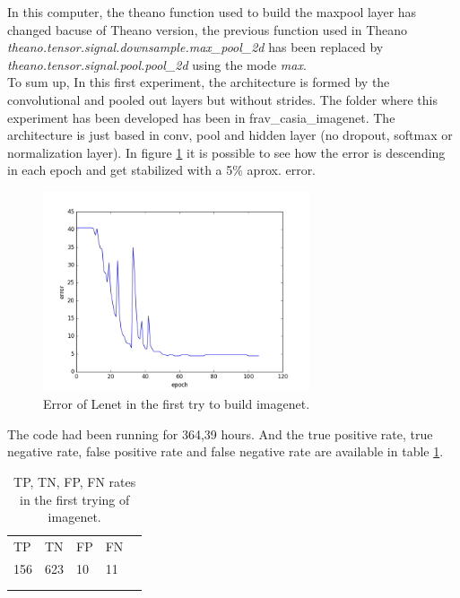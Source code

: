 In this computer, the theano function used to build the max\-pool layer has changed bacuse of Theano version, the previous function used in Theano  \textit{theano.te\-nsor.sig\-nal.down\-sam\-ple.max\-\_pool\_2d} has been replaced by \textit{thea\-no.ten\-sor.sig\-nal.pool.pool\_2d} using the mode \textit{max}.\\

To  sum up, In this first experiment, the architecture is formed by the convolutional and pooled out layers but without strides. The folder where this experiment has been developed has been in frav\_casia\_imagenet. The architecture is just based in conv, pool and hidden layer (no dropout, softmax or normalization layer). In figure \ref{fig:error_imagenet1} it is possible to see how the error is descending in each epoch and get stabilized with a 5\% aprox. error. \\
\begin{figure}[htb]
\centering
\includegraphics[width=0.7\textwidth]{images/imagenet/error_frav-Imagenet1.png}
\caption{Error of Lenet in the first try to build imagenet.} \label{fig:error_imagenet1}
\end{figure}

The code had been running for 364,39 hours. And the true positive rate, true negative rate, false positive rate and false negative rate are available in table \ref{tabla_error_imagenet1}. \\

\begin{table}[htb]
\centering
\label{tabla_error_imagenet1}
\begin{tabular}{lllll}
\cline{1-4}
\multicolumn{1}{|l}{TP} & \multicolumn{1}{l}{TN} & \multicolumn{1}{l}{FP} & \multicolumn{1}{l|}{FN} &  \\ \cline{1-4}
\multicolumn{1}{|l}{156} & \multicolumn{1}{l}{623} & \multicolumn{1}{l}{10} & \multicolumn{1}{l|}{11} &  \\ \cline{1-4}
                         &                         &                         &                         &  \\
                         &                         &                         &                         &
\end{tabular}
\caption{TP, TN, FP, FN rates in the first trying of imagenet.}

\end{table}


